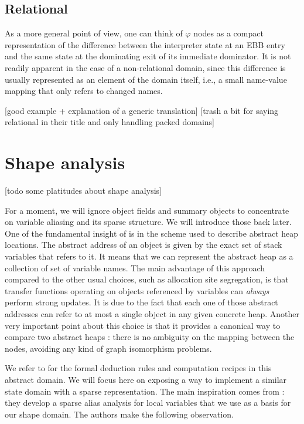 \documentclass[11pt]{article}
\renewcommand{\phi}{\varphi}
\begin{document}
\subsection*{Relational}

As a more general point of view, one can think of $\phi$ nodes as a compact representation of the difference between the interpreter state at an EBB entry and the same state at the dominating exit of its immediate dominator.
It is not readily apparent in the case of a non-relational domain, since this difference is usually represented as an element of the domain itself, i.e., a small name-value mapping that only refers to changed names.

[good example + explanation of a generic translation]
[trash a bit \cite{sparse-nr} for saying relational in their title and only handling packed domains]

\section*{Shape analysis}

[todo some platitudes about shape analysis]

For a moment, we will ignore object fields and summary objects to concentrate on variable aliasing and its sparse structure. We will introduce those back later.
One of the fundamental insight of \cite{ssc} is in the scheme used to describe abstract heap locations.
The abstract address of an object is given by the exact set of stack variables that refers to it.
It means that we can represent the abstract heap as a collection of set of variable names.
The main advantage of this approach compared to the other usual choices, such as allocation site segregation, is that transfer functions operating on objects referenced by variables can \emph{always} perform strong updates.
It is due to the fact that each one of those abstract addresses can refer to at most a single object in any given concrete heap.
Another very important point about this choice is that it provides a canonical way to compare two abstract heaps : there is no ambiguity on the mapping between the nodes, avoiding any kind of graph isomorphism problems.

We refer to \cite{ssc} for the formal deduction rules and computation recipes in this abstract domain.
We will focus here on exposing a way to implement a similar state domain with a sparse representation.
The main inspiration comes from \cite{ssa-alias} : they develop a sparse alias analysis for local variables that we use as a basis for our shape domain. The authors make the following observation.
\end{document}
